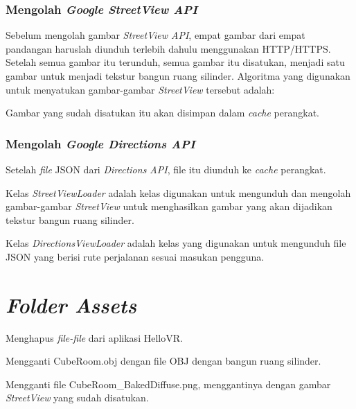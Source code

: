\subsubsection{Mengolah \textit{Google StreetView API}} 
Sebelum mengolah gambar \textit{StreetView API}, empat gambar dari empat pandangan haruslah diunduh terlebih dahulu menggunakan HTTP/HTTPS. Setelah semua gambar itu terunduh, semua gambar itu disatukan, menjadi satu gambar untuk menjadi tekstur bangun ruang silinder. Algoritma yang digunakan untuk menyatukan gambar-gambar \textit{StreetView} tersebut adalah:

Gambar yang sudah disatukan itu akan disimpan dalam \textit{cache} perangkat. 

\subsubsection{Mengolah \textit{Google Directions API}}
Setelah \textit{file} JSON dari \textit{Directions API}, file itu diunduh ke \textit{cache} perangkat.

Kelas \textit{StreetViewLoader} adalah kelas digunakan untuk mengunduh dan mengolah gambar-gambar \textit{StreetView} untuk menghasilkan gambar yang akan dijadikan tekstur bangun ruang silinder. 

Kelas \textit{DirectionsViewLoader} adalah kelas yang digunakan untuk mengunduh file JSON yang berisi rute perjalanan sesuai masukan pengguna.

\section{\textit{Folder Assets}}
Menghapus \textit{file-file} dari aplikasi HelloVR. 

Mengganti CubeRoom.obj dengan file OBJ dengan bangun ruang silinder.

Mengganti file CubeRoom_BakedDiffuse.png, menggantinya dengan gambar \textit{StreetView} yang sudah disatukan. 


